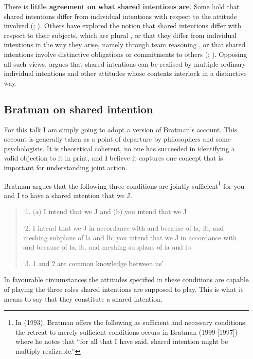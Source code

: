 \documentclass[12pt,a4paper]{extarticle}
\begin{document}
There is \textbf{little agreement on what shared intentions are}. 
Some hold that shared intentions differ from individual intentions with respect to the attitude involved (\citealp{Kutz:2000si}; \citealp{Searle:1990em}). 
Others have explored the notion that shared intentions differ with respect to their subjects, which are plural \citep{Gilbert:1992rs}, 
or that they differ from individual intentions in the way they arise, namely through team reasoning \citep{Gold:2007zd}, 
or that shared intentions involve distinctive obligations or commitments to others (\citealp{Gilbert:1992rs}; \citealp{Roth:2004ki}).
Opposing all such views, \citet{Bratman:1992mi,Bratman:2009lv} argues that shared intentions can be realised by multiple ordinary individual intentions and other attitudes whose contents interlock in a distinctive way. 

\subsection{Bratman on shared intention}
For this talk I am simply going to adopt a version of Bratman's account.
This account is generally taken as a point of departure by philosophers and some psychologists.
It is theoretical coherent, 
no one has succeeded in identifying a valid objection to it in print, 
and I believe it captures one concept that is important for understanding joint action.

Bratman argues that the following three conditions are jointly sufficient\footnote{
In (1993), Bratman offers the following as sufficient and necessary conditions; the retreat to merely sufficient conditions occurs in Bratman (1999 [1997]) where he notes that “for all that I have said, shared intention might be multiply realizable.”
}  
for you and I to have a shared intention that we J. 
%
\begin{quote}
`1. (a) I intend that we J and (b) you intend that we J

`2. I intend that we J in accordance with and because of la, lb, and meshing subplans of la and lb; you intend that we J in accordance with and because of la, lb, and meshing subplans of la and lb

`3. 1 and 2 are common knowledge between us' \citep[View 4]{Bratman:1993je}
\end{quote}
%
In favourable circumstances the attitudes specified in these conditions are capable of playing the three roles shared intentions are supposed to play.  This is what it means to say that they constitute a shared intention.
\end{document}
